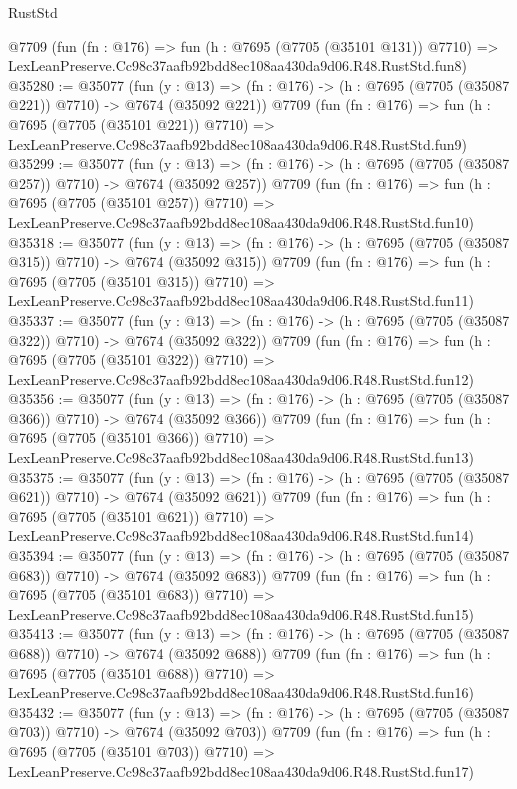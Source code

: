 \begin{lexlean}{RustStd}
\begin{coremodule}
    @7709
    (fun (fn : @176) =>
    fun (h : @7695 (@7705 (@35101 @131)) @7710) =>
    LexLeanPreserve.Cc98c37aafb92bdd8ec108aa430da9d06.R48.RustStd.fun8)
@35280 := @35077
    (fun (y : @13) => (fn : @176) -> (h : @7695 (@7705 (@35087 @221)) @7710) -> @7674 (@35092 @221))
    @7709
    (fun (fn : @176) =>
    fun (h : @7695 (@7705 (@35101 @221)) @7710) =>
    LexLeanPreserve.Cc98c37aafb92bdd8ec108aa430da9d06.R48.RustStd.fun9)
@35299 := @35077
    (fun (y : @13) => (fn : @176) -> (h : @7695 (@7705 (@35087 @257)) @7710) -> @7674 (@35092 @257))
    @7709
    (fun (fn : @176) =>
    fun (h : @7695 (@7705 (@35101 @257)) @7710) =>
    LexLeanPreserve.Cc98c37aafb92bdd8ec108aa430da9d06.R48.RustStd.fun10)
@35318 := @35077
    (fun (y : @13) => (fn : @176) -> (h : @7695 (@7705 (@35087 @315)) @7710) -> @7674 (@35092 @315))
    @7709
    (fun (fn : @176) =>
    fun (h : @7695 (@7705 (@35101 @315)) @7710) =>
    LexLeanPreserve.Cc98c37aafb92bdd8ec108aa430da9d06.R48.RustStd.fun11)
@35337 := @35077
    (fun (y : @13) => (fn : @176) -> (h : @7695 (@7705 (@35087 @322)) @7710) -> @7674 (@35092 @322))
    @7709
    (fun (fn : @176) =>
    fun (h : @7695 (@7705 (@35101 @322)) @7710) =>
    LexLeanPreserve.Cc98c37aafb92bdd8ec108aa430da9d06.R48.RustStd.fun12)
@35356 := @35077
    (fun (y : @13) => (fn : @176) -> (h : @7695 (@7705 (@35087 @366)) @7710) -> @7674 (@35092 @366))
    @7709
    (fun (fn : @176) =>
    fun (h : @7695 (@7705 (@35101 @366)) @7710) =>
    LexLeanPreserve.Cc98c37aafb92bdd8ec108aa430da9d06.R48.RustStd.fun13)
@35375 := @35077
    (fun (y : @13) => (fn : @176) -> (h : @7695 (@7705 (@35087 @621)) @7710) -> @7674 (@35092 @621))
    @7709
    (fun (fn : @176) =>
    fun (h : @7695 (@7705 (@35101 @621)) @7710) =>
    LexLeanPreserve.Cc98c37aafb92bdd8ec108aa430da9d06.R48.RustStd.fun14)
@35394 := @35077
    (fun (y : @13) => (fn : @176) -> (h : @7695 (@7705 (@35087 @683)) @7710) -> @7674 (@35092 @683))
    @7709
    (fun (fn : @176) =>
    fun (h : @7695 (@7705 (@35101 @683)) @7710) =>
    LexLeanPreserve.Cc98c37aafb92bdd8ec108aa430da9d06.R48.RustStd.fun15)
@35413 := @35077
    (fun (y : @13) => (fn : @176) -> (h : @7695 (@7705 (@35087 @688)) @7710) -> @7674 (@35092 @688))
    @7709
    (fun (fn : @176) =>
    fun (h : @7695 (@7705 (@35101 @688)) @7710) =>
    LexLeanPreserve.Cc98c37aafb92bdd8ec108aa430da9d06.R48.RustStd.fun16)
@35432 := @35077
    (fun (y : @13) => (fn : @176) -> (h : @7695 (@7705 (@35087 @703)) @7710) -> @7674 (@35092 @703))
    @7709
    (fun (fn : @176) =>
    fun (h : @7695 (@7705 (@35101 @703)) @7710) =>
    LexLeanPreserve.Cc98c37aafb92bdd8ec108aa430da9d06.R48.RustStd.fun17)

\end{coremodule}
\end{lexlean}

